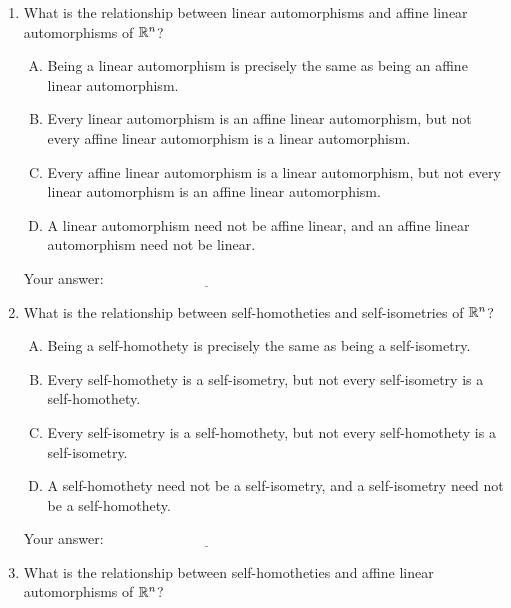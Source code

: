 \documentclass[10pt]{amsart}
\begin{document}
\begin{enumerate}
\item What is the relationship between linear automorphisms and affine
  linear automorphisms of $\mathbb{R}^n$?

  \begin{enumerate}[(A)]
  \item Being a linear automorphism is precisely the same as being an
    affine linear automorphism.
  \item Every linear automorphism is an affine linear automorphism,
    but not every affine linear automorphism is a linear automorphism.
  \item Every affine linear automorphism is a linear automorphism, but
    not every linear automorphism is an affine linear automorphism.
  \item A linear automorphism need not be affine linear, and an affine
    linear automorphism need not be linear.
  \end{enumerate}

  \vspace{0.1in}
  Your answer: $\underline{\qquad\qquad\qquad\qquad\qquad\qquad\qquad}$
  \vspace{0.1in}


\item What is the relationship between self-homotheties and
  self-isometries of $\mathbb{R}^n$?

  \begin{enumerate}[(A)]
  \item Being a self-homothety is precisely the same as being a
    self-isometry.
  \item Every self-homothety is a self-isometry, but not every
    self-isometry is a self-homothety.
  \item Every self-isometry is a self-homothety, but not every
    self-homothety is a self-isometry.
  \item A self-homothety need not be a self-isometry, and a
    self-isometry need not be a self-homothety.
  \end{enumerate}

  \vspace{0.1in}
  Your answer: $\underline{\qquad\qquad\qquad\qquad\qquad\qquad\qquad}$
  \vspace{0.1in}

\item What is the relationship between self-homotheties and affine
  linear automorphisms of $\mathbb{R}^n$?


\end{enumerate}
\end{document}
